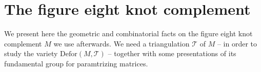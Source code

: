 \section{The figure eight knot complement}\label{section:intro-eight}

We present here the geometric and combinatorial facts on the figure eight knot complement $M$ we use afterwards. We need a triangulation $\mathcal T$ of $M$ -- in order to study the variety $\mathrm{Defor}(M,\mathcal T)$ -- together with some presentations of its fundamental group for paramtrizing matrices.

